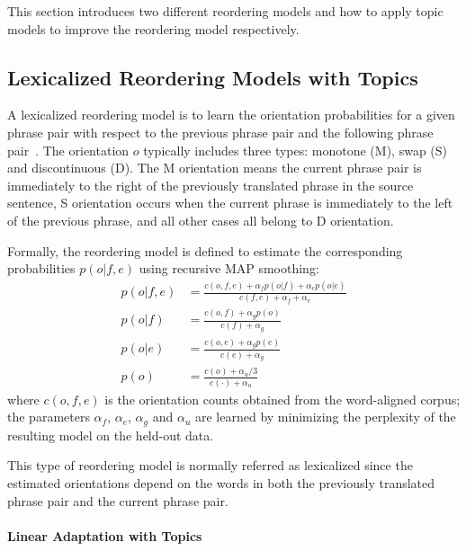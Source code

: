 This section introduces two different reordering models and how to
apply topic models to improve the reordering model respectively.


\subsection{Lexicalized Reordering Models with Topics}

A lexicalized reordering model is to learn the orientation
probabilities for a given phrase pair with respect to the previous
phrase pair and the following phrase pair~\citep{Chen-2013}. The
orientation $o$ typically includes three types: monotone (M), swap (S)
and discontinuous (D). The M orientation means the current phrase pair
is immediately to the right of the previously translated phrase in the
source sentence, S orientation occurs when the current phrase is
immediately to the left of the previous phrase, and all other cases
all belong to D orientation.

Formally, the reordering model is defined to estimate the
corresponding probabilities $p(o|f,e)$ using recursive MAP smoothing:
\begin{align}
p(o|f,e) &= \frac{c(o,f,e) + \alpha_f p(o|f) + \alpha_e p(o|e)}{c(f,e) + \alpha_f + \alpha_e} \\
p(o|f) &= \frac{c(o,f) + \alpha_g p(o)}{c(f) + \alpha_g} \\
p(o|e) &= \frac{c(o,e) + \alpha_g p(e)}{c(e) + \alpha_g} \\
p(o) &= \frac{c(o) + \alpha_u/3}{c(\cdot) + \alpha_u}
\end{align}
where $c(o,f,e)$ is the orientation counts obtained from the word-aligned corpus;  the parameters $\alpha_f$, $\alpha_e$, $\alpha_g$ and $\alpha_u$ are learned by minimizing the perplexity of the resulting model on the held-out data.

This type of reordering model is normally referred as lexicalized
since the estimated orientations depend on the words in both the
previously translated phrase pair and the current phrase pair.

\paragraph{Linear Adaptation with Topics}

